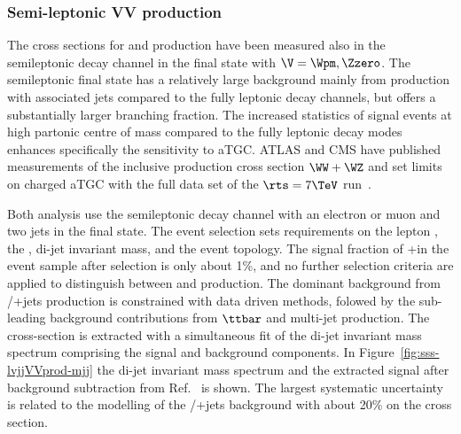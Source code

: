 \subsubsection{Semi-leptonic VV production}
\label{sss-VVprod}



The cross sections for \WW\; and \WZ\; production have been measured also in the 
semileptonic decay channel in the \WVlvqq\; final state with $\V=\Wpm,\Zzero$.
The semileptonic final state has a relatively large background mainly from \V\; production
with associated jets compared to the fully leptonic decay channels, but offers a 
substantially larger branching fraction. The increased statistics of signal events 
at high partonic centre of mass compared to the fully leptonic 
decay modes enhances specifically the sensitivity to aTGC.
ATLAS and CMS have published measurements of the
inclusive production cross section $\WW+\WZ$ and set limits on charged aTGC 
with the full data set of the $\rts=7\TeV$ run~\cite{Aad:2014mda,Chatrchyan:2012bd}.

Both analysis use the semileptonic decay channel with an electron or muon
and two jets in the final state.
The event selection sets requirements 
on the lepton \pT, the \MET, di-jet invariant mass, and the event topology. 
The signal fraction of \WW+\WZ in the event sample after selection is only about 1\%, 
and no further selection criteria are applied to distinguish between 
\WW\; and \WZ\; production.
The dominant background from \Z/\W+jets production is constrained with data driven methods,
folowed by the sub-leading background contributions from $\ttbar$ and multi-jet production. 
The cross-section is extracted with a simultaneous fit of the di-jet invariant mass 
spectrum comprising the signal and background components. In Figure~\ref{fig:sss-lvjjVVprod-mjj} the di-jet invariant
mass spectrum and the extracted signal after background subtraction from Ref.~\cite{Aad:2014mda} is shown. 
The largest systematic uncertainty is related to the modelling of the \Z/\W+jets background
with about 20\% on the cross section.

